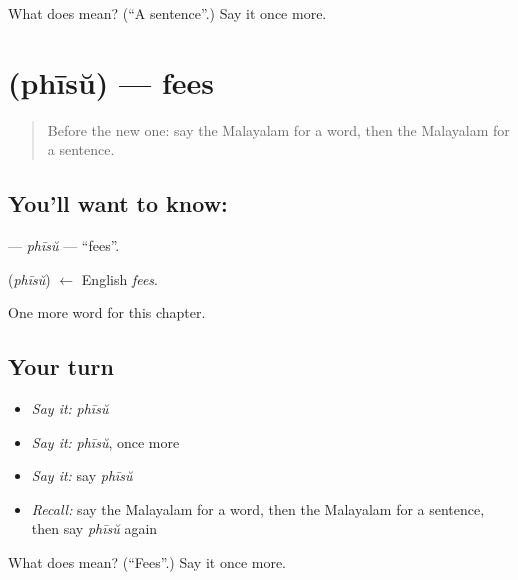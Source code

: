 \begin{tcolorbox}[breakable,colback=teal!4,colframe=teal!35!black,title={Before you move on}]
What does  mean? (\textquotedblleft{}A sentence\textquotedblright{}.) Say it once more.
\end{tcolorbox}
\section[\texorpdfstring{\ml{ഫീസ്} (phīsŭ)}{ഫീസ് (phīsŭ)}]{ (phīsŭ) — fees}

\label{lesson:ML-C221-phisu}



\begin{quote}
Before the new one: say the Malayalam for a word, then the Malayalam for a sentence.
\end{quote}

\subsection*{You'll want to know: }
\textbf{} — \emph{phīsŭ} — \textquotedblleft{}fees\textquotedblright{}.

\begin{cousinweb}
\textbf{} (\emph{phīsŭ}) $\leftarrow$ English \emph{fees}.
\end{cousinweb}

\begin{grammarlens}[title={What you've built}]
One more word for this chapter.
\end{grammarlens}

\subsection*{Your turn}
\begin{itemize}
\raggedright
  \item \emph{Say it:} \emph{phīsŭ}
  \item \emph{Say it:} \emph{phīsŭ}, once more
  \item \emph{Say it:} say \emph{phīsŭ}
  \item \emph{Recall:} say the Malayalam for a word, then the Malayalam for a sentence, then say \emph{phīsŭ} again
\end{itemize}

\begin{tcolorbox}[breakable,colback=teal!4,colframe=teal!35!black,title={Before you move on}]
What does  mean? (\textquotedblleft{}Fees\textquotedblright{}.) Say it once more.
\end{tcolorbox}
